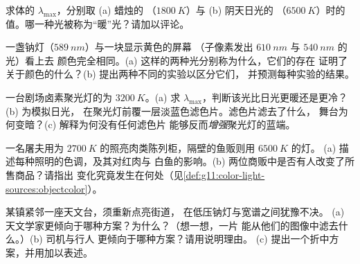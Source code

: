 \begin{exercise}[$\star\star$]\label{exo:g11:color-light-sources:11}
求体的 $\lambda_{\max}$，分别取 (a) 蜡烛的
（$\qty{1800}{K}$）与 (b) 阴天日光的
（$\qty{6500}{K}$）时的值。哪一种光被称为“暖”光？请加以评论。
\end{exercise}

\begin{exercise}[$\star\star\star$]\label{exo:g11:color-light-sources:12}
一盏钠灯（$\qty{589}{nm}$）与一块显示黄色的屏幕
（子像素发出 $\qty{610}{nm}$ 与 $\qty{540}{nm}$ 的光）看上去
颜色完全相同。(a) 这样的两种光分别称为什么，它们的存在
证明了关于颜色的什么？(b) 提出两种不同的实验以区分它们，
并预测每种实验的结果。
\end{exercise}

\begin{exercise}[$\star\star\star$]\label{exo:g11:color-light-sources:13}
一台剧场卤素聚光灯的为 $\qty{3200}{K}$。(a) 求
$\lambda_{\max}$，判断该光比日光更暖还是更冷？(b) 为模拟日光，
在聚光灯前覆一层淡蓝色滤色片。滤色片滤去了什么，
舞台为何变暗？(c) 解释为何没有任何滤色片
能够反而\emph{增强}聚光灯的蓝端。
\end{exercise}

\begin{exercise}[$\star\star\star$]\label{exo:g11:color-light-sources:14}
一名屠夫用为
$\qty{2700}{K}$ 的照亮肉类陈列柜，隔壁的鱼贩则用 $\qty{6500}{K}$ 的灯。
(a) 描述每种照明的色调，及其对红肉与
白鱼的影响。(b) 两位商贩中是否有人改变了所售商品？请指出
变化究竟发生在何处（见\cref{def:g11:color-light-sources:objectcolor}）。
\end{exercise}

\begin{exercise}[$\star\star\star$]\label{exo:g11:color-light-sources:15}
某镇紧邻一座天文台，须重新点亮街道，
在低压钠灯与宽谱之间犹豫不决。
(a) 天文学家更倾向于哪种方案？为什么？（想一想，一片
能从他们的图像中滤去什么。）(b) 司机与行人
更倾向于哪种方案？请用说明理由。
(c) 提出一个折中方案，并用加以表述。
\end{exercise}

